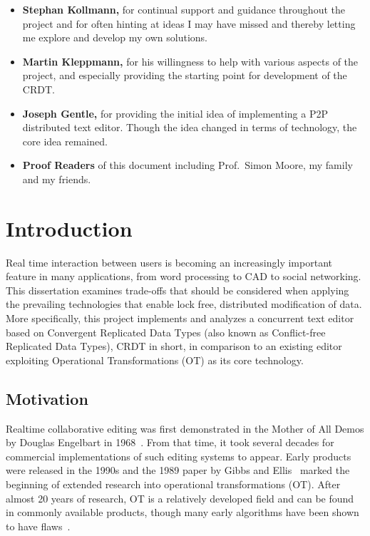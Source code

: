 \documentclass[12pt,a4paper,twoside,openright]{report}
\begin{document}
\begin{itemize}
	\item{\textbf{Stephan Kollmann,} for continual support and guidance throughout the project and for often hinting at ideas I may have missed and thereby letting me explore and develop my own solutions.}
	
	\item{\textbf{Martin Kleppmann,} for his willingness to help with various aspects of the project, and especially providing the starting point for development of the CRDT.}
	
	\item{\textbf{Joseph Gentle,} for providing the initial idea of implementing a P2P distributed text editor. Though the idea changed in terms of technology, the core idea remained.}
	
	\item{\textbf{Proof Readers} of this document including Prof.~Simon Moore, my family and my friends.}
	
\end{itemize}



\pagestyle{headings}

\chapter{Introduction}

Real time interaction between users is becoming an increasingly important feature in many applications, from word processing to CAD to social networking. This dissertation examines trade-offs that should be considered when applying the prevailing technologies that enable lock free, distributed modification of data. More specifically, this project implements and analyzes a concurrent text editor based on Convergent Replicated Data Types (also known as Conflict-free Replicated Data Types), CRDT in short, in comparison to an existing editor exploiting Operational Transformations (OT) as its core technology.


\section{Motivation}

Realtime collaborative editing was first demonstrated in the Mother of All Demos by Douglas Engelbart in 1968~\cite{MotherDemo}. From that time, it took several decades for commercial implementations of such editing systems to appear. Early products were released in the 1990s and the 1989 paper by Gibbs and Ellis~\cite{Ellis1989} marked the beginning of extended research into operational transformations (OT). After almost 20 years of research, OT is a relatively developed field and can be found in commonly available products, though many early algorithms have been shown to have flaws~\cite{oster2005proving}. 
\end{document}
